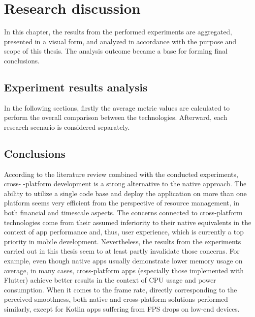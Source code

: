 
\chapter{Research discussion}

In this chapter, the results from the performed experiments are aggregated, presented in a visual form, and analyzed in accordance with the purpose and scope of this thesis. The analysis outcome became a base for forming final conclusions.

\section{Experiment results analysis}

In the following sections, firstly the average metric values are calculated to perform the overall comparison between the technologies. Afterward, each research scenario is considered separately.











\section{Conclusions}

According to the literature review combined with the conducted experiments, cross- -platform development is a strong alternative to the native approach. The ability to utilize a single code base and deploy the application on more than one platform seems very efficient from the perspective of resource management, in both financial and timescale aspects. The concerns connected to cross-platform technologies come from their assumed inferiority to their native equivalents in the context of app performance and, thus, user experience, which is currently a top priority in mobile development. Nevertheless, the results from the experiments carried out in this thesis seem to at least partly invalidate those concerns. For example, even though native apps usually demonstrate lower memory usage on average, in many cases, cross-platform apps (especially those implemented with Flutter) achieve better results in the context of CPU usage and power consumption. When it comes to the frame rate, directly corresponding to the perceived smoothness, both native and cross-platform solutions performed similarly, except for Kotlin apps suffering from FPS drops on low-end devices.

